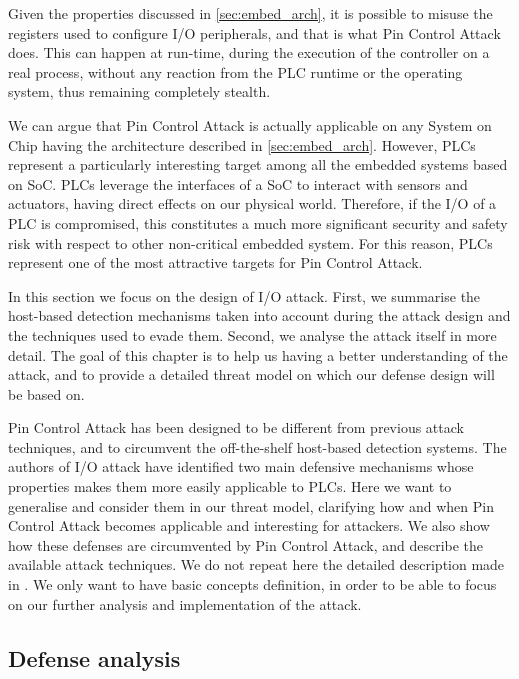 Given the properties discussed in \sec \ref{sec:embed_arch}, it is possible to misuse the registers used to configure I/O peripherals,
and that is what Pin Control Attack does. This can happen at run-time, during the execution of the controller on a real process,
without any reaction from the PLC runtime or the operating system, thus remaining completely stealth.

We can argue that Pin Control Attack is actually applicable on any System on Chip having the
architecture described in \sec \ref{sec:embed_arch}. However, PLCs represent a particularly interesting target among all the embedded systems based on SoC.
PLCs leverage the interfaces of a SoC to interact with sensors and actuators, having direct effects on our physical world.
Therefore, if the I/O of a PLC is compromised, this constitutes a much more significant security and safety risk with respect to other
non-critical embedded system. For this reason, PLCs represent one of the most attractive targets for Pin Control Attack.

In this section we focus on the design of I/O attack. First, we summarise the host-based detection mechanisms taken into account
during the attack design and the techniques used to evade them. Second, we analyse the attack itself in more detail.
The goal of this chapter is to help us having a better understanding of the attack, and to provide a detailed threat model on which our defense design will be based on.

Pin Control Attack has been designed to be different from previous attack techniques, and to circumvent the off-the-shelf host-based detection systems.
The authors of I/O attack have identified two main defensive mechanisms whose properties makes them more easily applicable to PLCs.
Here we want to generalise and consider them in our threat model, clarifying how and when Pin Control Attack becomes applicable and interesting for attackers.
We also show how these defenses are circumvented by Pin Control Attack, and describe the available attack techniques.
We do not repeat here the detailed description made in \cite{ghostplc}. We only want to have basic concepts definition,
in order to be able to focus on our further analysis and implementation of the attack.


\subsection{Defense analysis}
\label{sec:def_analysis}

